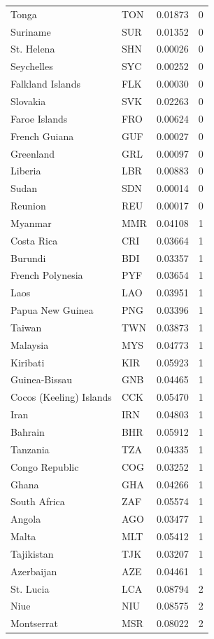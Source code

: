 \begin{table}[htbp]
\begin{tabular}{llcc}
Tonga & TON &  0.01873 & 0 \\
Suriname & SUR &  0.01352 & 0 \\
St. Helena & SHN &  0.00026 & 0 \\
Seychelles & SYC &  0.00252 & 0 \\
Falkland Islands & FLK &  0.00030 & 0 \\
Slovakia & SVK &  0.02263 & 0 \\
Faroe Islands & FRO &  0.00624 & 0 \\
French Guiana & GUF &  0.00027 & 0 \\
Greenland & GRL &  0.00097 & 0 \\
Liberia & LBR &  0.00883 & 0 \\
Sudan & SDN &  0.00014 & 0 \\
Reunion & REU &  0.00017 & 0 \\
Myanmar & MMR &  0.04108 & 1 \\
Costa Rica & CRI &  0.03664 & 1 \\
Burundi & BDI &  0.03357 & 1 \\
French Polynesia & PYF &  0.03654 & 1 \\
Laos & LAO &  0.03951 & 1 \\
Papua New Guinea & PNG &  0.03396 & 1 \\
Taiwan & TWN &  0.03873 & 1 \\
Malaysia & MYS &  0.04773 & 1 \\
Kiribati & KIR &  0.05923 & 1 \\
Guinea-Bissau & GNB &  0.04465 & 1 \\
Cocos (Keeling) Islands & CCK &  0.05470 & 1 \\
Iran & IRN &  0.04803 & 1 \\
Bahrain & BHR &  0.05912 & 1 \\
Tanzania & TZA &  0.04335 & 1 \\
Congo Republic & COG &  0.03252 & 1 \\
Ghana & GHA &  0.04266 & 1 \\
South Africa & ZAF &  0.05574 & 1 \\
Angola & AGO &  0.03477 & 1 \\
Malta & MLT &  0.05412 & 1 \\
Tajikistan & TJK &  0.03207 & 1 \\
Azerbaijan & AZE &  0.04461 & 1 \\
St. Lucia & LCA &  0.08794 & 2 \\
Niue & NIU &  0.08575 & 2 \\
Montserrat & MSR &  0.08022 & 2 \\

\end{tabular}
\end{table}
